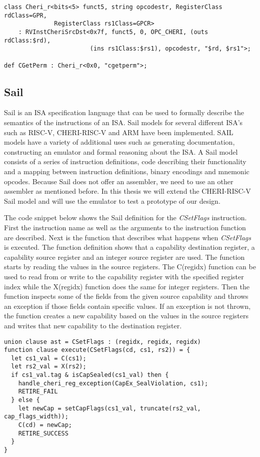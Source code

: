 \begin{verbatim}
class Cheri_r<bits<5> funct5, string opcodestr, RegisterClass rdClass=GPR,
              RegisterClass rs1Class=GPCR>
    : RVInstCheriSrcDst<0x7f, funct5, 0, OPC_CHERI, (outs rdClass:$rd),
                        (ins rs1Class:$rs1), opcodestr, "$rd, $rs1">;

def CGetPerm : Cheri_r<0x0, "cgetperm">;
\end{verbatim}


\subsection{Sail}
Sail is an ISA specification language that can be used to formally describe the semantics of the instructions of an ISA. Sail models for several different ISA's such as RISC-V, CHERI-RISC-V and ARM have been implemented. SAIL models have a variety of additional uses such as generating documentation, constructing an emulator and formal reasoning about the ISA.
A Sail model consists of a series of instruction definitions, code describing their functionality and a mapping between instruction definitions, binary encodings and mnemonic opcodes.
Because Sail does not offer an assembler, we need to use an other assembler as mentioned before.
In this thesis we will extend the CHERI-RISC-V Sail model and will use the emulator to test a prototype of our design.

The code snippet below shows the Sail definition for the \textit{CSetFlags} instruction.
First the instruction name as well as the arguments to the instruction function are described.
Next is the function that describes what happens when \textit{CSetFlags} is executed.
The function definition shows that a capability destination register, a capability source register and an integer source register are used.
The function starts by reading the values in the source registers.
The C(regidx) function can be used to read from or write to the capability register with the specified register index while the X(regidx) function does the same for integer registers.
Then the function inspects some of the fields from the given source capability and throws an exception if those fields contain specific values.
If an exception is not thrown, the function creates a new capability based on the values in the source registers and writes that new capability to the destination register.

\begin{verbatim}
union clause ast = CSetFlags : (regidx, regidx, regidx)
function clause execute(CSetFlags(cd, cs1, rs2)) = {
  let cs1_val = C(cs1);
  let rs2_val = X(rs2);
  if cs1_val.tag & isCapSealed(cs1_val) then {
    handle_cheri_reg_exception(CapEx_SealViolation, cs1);
    RETIRE_FAIL
  } else {
    let newCap = setCapFlags(cs1_val, truncate(rs2_val, cap_flags_width));
    C(cd) = newCap;
    RETIRE_SUCCESS
  }
}
\end{verbatim}

